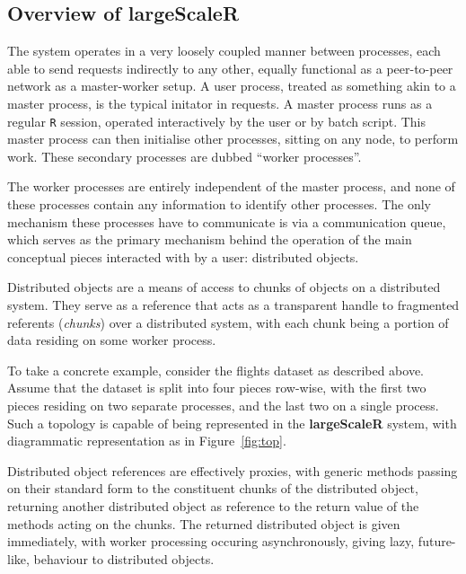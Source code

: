 \subsection{Overview of \textbf{largeScaleR}}\label{sec:sys-imp}

The system operates in a very loosely coupled manner between processes, each able to send requests indirectly to any other, equally functional as a peer-to-peer network as a master-worker setup.
A user process, treated as something akin to a master process, is the typical initator in requests. 
A master process runs as a regular \texttt{R} session, operated interactively by the user or by batch script.
This master process can then initialise other processes, sitting on any node, to perform work.
These secondary processes are dubbed ``worker processes''.

The worker processes are entirely independent of the master process, and none of these processes contain any information to identify other processes.
The only mechanism these processes have to communicate is via a communication queue, which serves as the primary mechanism behind the operation of the main conceptual pieces interacted with by a user: distributed objects.

Distributed objects are a means of access to chunks of objects on a distributed system\cite{emmerich2000engineering}.
They serve as a reference that acts as a transparent handle to fragmented referents (\textit{chunks}) over a distributed system, with each chunk being a portion of data residing on some worker process.

To take a concrete example, consider the flights dataset as described above.
Assume that the dataset is split into four pieces row-wise, with the first two pieces residing on two separate processes, and the last two on a single process.
Such a topology is capable of being represented in the \textbf{largeScaleR} system, with diagrammatic representation as in Figure~\ref{fig:top}.



Distributed object references are effectively proxies, with generic methods passing on their standard form to the constituent chunks of the distributed object, returning another distributed object as reference to the return value of the methods acting on the chunks.
The returned distributed object is given immediately, with worker processing occuring asynchronously, giving lazy, future-like, behaviour to distributed objects\cite{baker1977incremental}.

